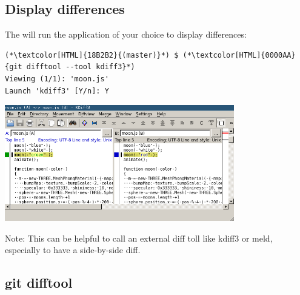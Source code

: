 \subsection{Display differences}
\begin{frame}[fragile]
    \subslidetitle
  The  will run the application of your choice to display differences:
  \begin{lstlisting}
(*\textcolor[HTML]{18B2B2}{(master)}*) $ (*\textcolor[HTML]{0000AA}{git difftool --tool kdiff3}*)
Viewing (1/1): 'moon.js'
Launch 'kdiff3' [Y/n]: Y
\end{lstlisting}

  \vspace{1em}
  \centerline{\includegraphics[width=10cm]{../screen/git-difftool-kdiff3.png}}

  Note: This can be helpful to call an external diff toll like kdiff3 or meld, especially to have a side-by-side diff.

\end{frame}
\begin{frame}[fragile]
    \subslidetitle
\end{frame}

\subsection{git difftool}
\begin{frame}[fragile]
    \subslidetitle
\end{frame}

